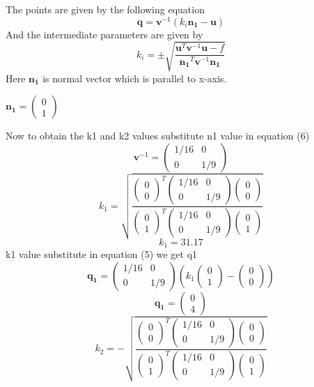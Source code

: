 \documentclass[10pt, a4paper]{article}
\newcommand{\myvec}[1]{\ensuremath{\begin{pmatrix}#1\end{pmatrix}}}
\let\vec\mathbf
\begin{document}
The points are given by the following equation\\
\begin{equation}
\vec{q}=\vec{v}^{-1}(k_i\vec{n_1}-\vec{u})
\end{equation}
And the intermediate parameters are given by\\
\begin{equation}
k_i=\pm\sqrt{\frac{\vec{u}^T\vec{v}^{-1}\vec{u}-f}{\vec{n_1}^T\vec{v}^{-1}\vec{n_1}}}
\end{equation}
Here $\vec{n_1}$ is normal vector which is parallel to x-axis.\\
\begin{center}
		$\vec{n_1}=\myvec{0\\1}$\\
\end{center}
Now to obtain the k1 and k2 values substitute n1 value in equation (6)\\
\begin{equation}
\vec{v}^{-1}=\myvec{1/16&0\\0&1/9}
\end{equation}
\begin{equation}
k_1=\sqrt{\frac{\myvec{0\\0}^T\myvec{1/16&0\\0&1/9}\myvec{0\\0}}{\myvec{0\\1}^T\myvec{1/16&0\\0&1/9}\myvec{0\\1}}}
\end{equation}
\begin{equation}
k_1=31.17
\end{equation}
k1 value substitute in equation (5) we get q1\\
\begin{equation}
\vec{q_1}={\myvec{1/16&0\\0&1/9}(k_1\myvec{0\\1}-\myvec{0\\0})}
\end{equation}
\begin{equation}
\vec{q_1}=\myvec{0\\4}
\end{equation}
\begin{equation}
k_2=-\sqrt{\frac{\myvec{0\\0}^T\myvec{1/16&0\\0&1/9}\myvec{0\\0}}{\myvec{0\\1}^T\myvec{1/16&0\\0&1/9}\myvec{0\\1}}}
\end{equation}
\end{document}
